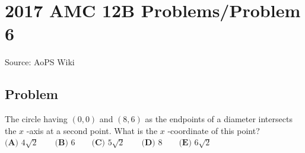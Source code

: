 \documentclass[12pt]{article}
\begin{document}
\section*{{2017 AMC 12B Problems/Problem 6}}
Source: AoPS Wiki

\subsection*{Problem}
The circle having $(0,0)$ and $(8,6)$ as the endpoints of a diameter intersects the $x$ -axis at a second point. What is the $x$ -coordinate of this point? $\textbf{(A) } 4\sqrt{2} \qquad\textbf{(B) } 6 \qquad\textbf{(C) } 5\sqrt{2} \qquad\textbf{(D) } 8 \qquad\textbf{(E) } 6\sqrt{2}$
\end{document}
